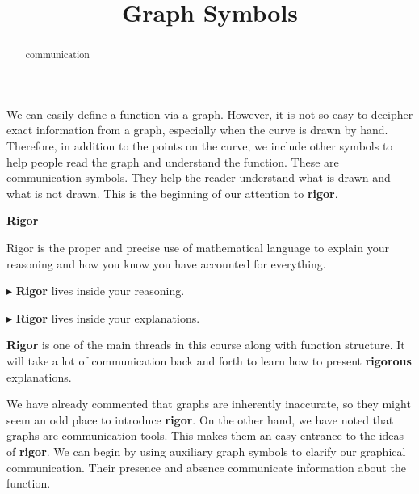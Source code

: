 \documentclass{ximera}
\title{Graph Symbols}
\begin{document}
\begin{abstract}
communication
\end{abstract}
\maketitle



We can easily define a function via a graph.  However, it is not so easy to decipher exact information from a graph, especially when the curve is drawn by hand.  Therefore, in addition to the points on the curve, we include other symbols to help people read the graph and understand the function.  These are communication symbols.  They help the reader understand what is drawn and what is not drawn.  This is the beginning of our attention to \textbf{\textcolor{purple!85!blue}{rigor}}.




\begin{definition} \textbf{\textcolor{green!50!black}{Rigor}} 


Rigor is the proper and precise use of mathematical language to explain your reasoning and how you know you have accounted for everything.



\textbf{$\blacktriangleright$} \textbf{\textcolor{green!50!black}{Rigor}} lives inside your reasoning. 

\textbf{$\blacktriangleright$} \textbf{\textcolor{green!50!black}{Rigor}} lives inside your explanations. 




\end{definition}






\textbf{\textcolor{purple!85!blue}{Rigor}} is one of the main threads in this course along with function structure.  It will take a lot of communication back and forth to learn how to present \textbf{\textcolor{purple!85!blue}{rigorous}} explanations. 


We have already commented that graphs are inherently inaccurate, so they might seem an odd place to introduce \textbf{\textcolor{purple!85!blue}{rigor}}.  On the other hand, we have noted that graphs are communication tools. This makes them an easy entrance to the ideas of \textbf{\textcolor{purple!85!blue}{rigor}}.  We can begin by using auxiliary graph symbols to clarify our graphical communication. Their presence and absence communicate information about the function.
\end{document}

